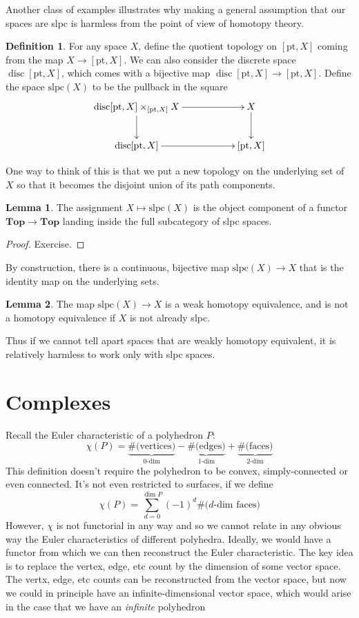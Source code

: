 \documentclass{tufte-handout}
\def\pt {\mathrm{pt}}
\def\Top {\mathbf{Top}}
\DeclareMathOperator{\disc}{disc}
\theoremstyle{definition}
\newtheorem{lemma}{Lemma}
\newtheorem{definition}{Definition}
\begin{document}
Another class of examples illustrates why making a general assumption that our spaces are slpc is harmless from the point of view of homotopy theory.

\begin{definition}
For any space $X$, define the quotient topology on $[\pt,X]$ coming from the map $X\to [\pt,X]$. We can also consider the discrete space $\disc[\pt,X]$, which comes with a bijective map $\disc[\pt,X] \to [\pt,X]$. Define the space $\mathrm{slpc}(X)$ to be the pullback in the square
\[
	\xymatrix{
		\disc[\pt,X] \times_{[\pt,X]} X \ar[rr] \ar[d] && X \ar[d]\\
		\disc[\pt,X] \ar[rr] && [\pt,X]
	}
\]
\end{definition}

One way to think of this is that we put a new topology on the underlying set of $X$ so that it becomes the disjoint union of its path components.

\begin{lemma}
The assignment $X\mapsto \mathrm{slpc}(X)$ is the object component of a functor $\Top \to \Top$ landing inside the full subcategory of slpc spaces.
\end{lemma}

\begin{proof}
Exercise.
\end{proof}

By construction, there is a continuous, bijective map $\mathrm{slpc}(X) \to X$ that is the identity map on the underlying sets.

\begin{lemma}
The map $\mathrm{slpc}(X) \to X$ is a weak homotopy equivalence, and is not a homotopy equivalence if $X$ is not already slpc.
\end{lemma}

Thus if we cannot tell apart spaces that are weakly homotopy equivalent, it is relatively harmless to work only with slpc spaces.

\section{Complexes}

Recall the Euler characteristic of a polyhedron $P$:
\[
	\chi(P) = \underbrace{\text{\#(vertices)}}_{0\text{-dim}} - \underbrace{\text{\#(edges)}}_{1\text{-dim}} + \underbrace{\text{\#(faces)}}_{2\text{-dim}}
\]
This definition doesn't require the polyhedron to be convex, simply-connected or even connected. It's not even restricted to surfaces, if we define
\[
	\chi(P) = \sum_{d=0}^{\dim P} (-1)^d \text{\#($d$-dim faces)}
\]
However, $\chi$ is not functorial in any way and so we cannot relate in any obvious way the Euler characteristics of different polyhedra. Ideally, we would have a functor from which we can then reconstruct the Euler characteristic. The key idea is to replace the vertex, edge, etc count by the dimension of some vector space. The vertx, edge, etc counts can be reconstructed from the vector space, but now we could in principle have an infinite-dimensional vector space, which would arise in the case that we have an \emph{infinite} polyhedron
\end{document}
